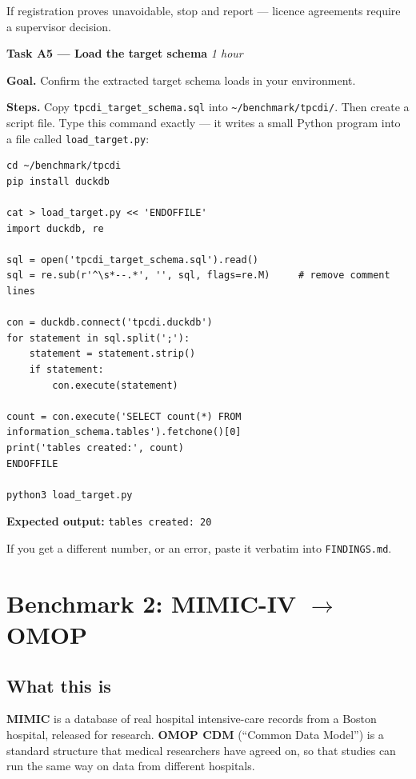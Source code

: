 \documentclass[11pt,a4paper]{article}
\newcommand{\code}[1]{\texttt{\small #1}}
\begin{document}
If registration proves unavoidable, stop and report --- licence agreements require a
supervisor decision.

\vspace{4pt}
\begin{taskbox}
\textbf{Task A5 --- Load the target schema} \hfill \emph{1 hour}
\end{taskbox}

\textbf{Goal.} Confirm the extracted target schema loads in your environment.

\textbf{Steps.} Copy \code{tpcdi\_target\_schema.sql} into
\code{\textasciitilde/benchmark/tpcdi/}. Then create a script file. Type this command
exactly --- it writes a small Python program into a file called \code{load\_target.py}:

\begin{lstlisting}[style=sh]
cd ~/benchmark/tpcdi
pip install duckdb

cat > load_target.py << 'ENDOFFILE'
import duckdb, re

sql = open('tpcdi_target_schema.sql').read()
sql = re.sub(r'^\s*--.*', '', sql, flags=re.M)     # remove comment lines

con = duckdb.connect('tpcdi.duckdb')
for statement in sql.split(';'):
    statement = statement.strip()
    if statement:
        con.execute(statement)

count = con.execute('SELECT count(*) FROM information_schema.tables').fetchone()[0]
print('tables created:', count)
ENDOFFILE

python3 load_target.py
\end{lstlisting}



\textbf{Expected output:} \code{tables created: 20}

If you get a different number, or an error, paste it verbatim into \code{FINDINGS.md}.

\clearpage
\section{Benchmark 2: MIMIC-IV $\rightarrow$ OMOP}
\label{sec:mimic}

\subsection{What this is}

\textbf{MIMIC} is a database of real hospital intensive-care records from a Boston
hospital, released for research. \textbf{OMOP CDM} (``Common Data Model'') is a standard
structure that medical researchers have agreed on, so that studies can run the same way on
data from different hospitals.
\end{document}
